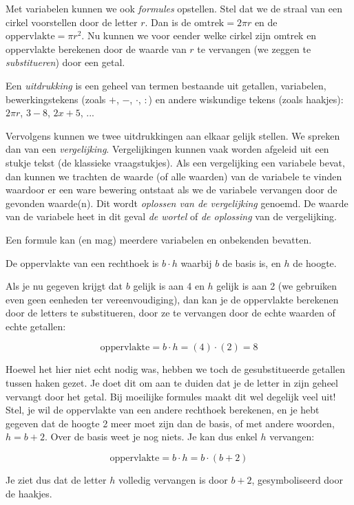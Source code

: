 Met variabelen kunnen we ook \emph{formules} opstellen.
Stel dat we de straal van een cirkel voorstellen door de letter $r$.
Dan is de $\mathrm{omtrek}=2\pi r$ en de $\mathrm{oppervlakte}=\pi r^{2}$.
Nu kunnen we voor eender welke cirkel zijn omtrek en oppervlakte berekenen
door de waarde van $r$ te vervangen (we zeggen te \emph{substitueren})
door een getal.




Een \emph{uitdrukking} is een geheel van termen bestaande
uit getallen, variabelen, bewerkingstekens (zoals $+$, $-$, $\cdot$, $:$) en andere
wiskundige tekens (zoals haakjes): $2\pi r$, $3-8$, $2x+5$, ...

Vervolgens kunnen we twee uitdrukkingen aan elkaar gelijk
stellen. We spreken dan van een \emph{vergelijking}. Vergelijkingen
kunnen vaak worden afgeleid uit een stukje tekst (de klassieke vraagstukjes).
Als een vergelijking een variabele bevat, dan kunnen we trachten de
waarde (of alle waarden) van de variabele te vinden waardoor er een
ware bewering ontstaat als we de variabele vervangen door de gevonden
waarde(n). Dit wordt \emph{oplossen van de vergelijking} genoemd.
De waarde van de variabele heet in dit geval \emph{de wortel} of \emph{de
oplossing} van de vergelijking.

Een formule kan (en mag) meerdere variabelen en onbekenden
bevatten. 


\begin{voorbeeld}
	De oppervlakte van een rechthoek is $b \cdot h$ waarbij $b$ de basis is,
en $h$ de hoogte.

Als je nu gegeven krijgt dat $b$ gelijk is aan 4 en $h$ gelijk is
aan 2 (we gebruiken even geen eenheden ter vereenvoudiging), dan kan
je de oppervlakte berekenen door de letters te substitueren, door
ze te vervangen door de echte waarden of echte getallen:

\begin{equation*}
\mathrm{oppervlakte}=b\cdot h=(4)\cdot(2)=8
\end{equation*}

Hoewel het hier niet echt nodig was, hebben we toch de gesubstitueerde
getallen tussen haken gezet. Je doet dit om aan te duiden dat je de
letter in zijn geheel vervangt door het getal. Bij moeilijke formules
maakt dit wel degelijk veel uit! Stel, je wil de oppervlakte van een
andere rechthoek berekenen, en je hebt gegeven dat de hoogte 2 meer
moet zijn dan de basis, of met andere woorden, $h=b+2$. Over de basis
weet je nog niets. Je kan dus enkel $h$ vervangen:

\begin{equation*}
\mathrm{oppervlakte}=b\cdot h=b\cdot(b+2)
\end{equation*}

Je ziet dus dat de letter $h$ volledig vervangen is door $b+2$,
gesymboliseerd door de haakjes.
\end{voorbeeld}



